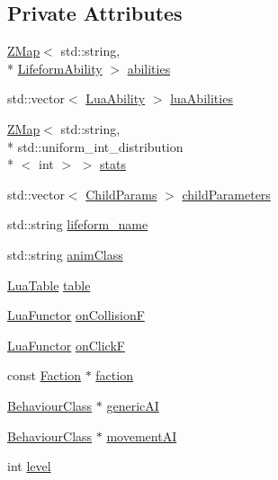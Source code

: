 \subsection*{Private Attributes}
\begin{DoxyCompactItemize}
\item 
\hyperlink{namespaceZeta_a9af2e12c4e432d2a1725f19e5a648a04}{Z\+Map}$<$ std\+::string, \\*
\hyperlink{structZeta_1_1LifeformClass_1_1LifeformAbility}{Lifeform\+Ability} $>$ \hyperlink{classZeta_1_1LifeformClass_a002f20ed3a907ee996b35fbd79d6fb5d}{abilities}
\item 
std\+::vector$<$ \hyperlink{structZeta_1_1LifeformClass_1_1LuaAbility}{Lua\+Ability} $>$ \hyperlink{classZeta_1_1LifeformClass_af30b98b4fe2f81cb08c053539625ddca}{lua\+Abilities}
\item 
\hyperlink{namespaceZeta_a9af2e12c4e432d2a1725f19e5a648a04}{Z\+Map}$<$ std\+::string, \\*
std\+::uniform\+\_\+int\+\_\+distribution\\*
$<$ int $>$ $>$ \hyperlink{classZeta_1_1LifeformClass_a4451d269f7dc4c5544d8b89b63a420ca}{stats}
\item 
std\+::vector$<$ \hyperlink{classZeta_1_1LifeformClass_1_1ChildParams}{Child\+Params} $>$ \hyperlink{classZeta_1_1LifeformClass_abe8c654163027c7b4810c115ee40a928}{child\+Parameters}
\item 
std\+::string \hyperlink{classZeta_1_1LifeformClass_aea28cfcaa64c28804ca61c4a29916380}{lifeform\+\_\+name}
\item 
std\+::string \hyperlink{classZeta_1_1LifeformClass_a0857894140b809d306d5ae432988e859}{anim\+Class}
\item 
\hyperlink{classZeta_1_1LuaTable}{Lua\+Table} \hyperlink{classZeta_1_1LifeformClass_aa8731df77ae7bd670fea69e182266dd3}{table}
\item 
\hyperlink{classZeta_1_1LuaFunctor}{Lua\+Functor} \hyperlink{classZeta_1_1LifeformClass_a13a27238c6107f52ec96528a36e783b4}{on\+Collision\+F}
\item 
\hyperlink{classZeta_1_1LuaFunctor}{Lua\+Functor} \hyperlink{classZeta_1_1LifeformClass_a47cd54e7ddee3d1da5413b2d30f77b40}{on\+Click\+F}
\item 
const \hyperlink{classZeta_1_1Faction}{Faction} $\ast$ \hyperlink{classZeta_1_1LifeformClass_a9784dbf810a8da0ede8893bf5dc7f6ba}{faction}
\item 
\hyperlink{classZeta_1_1BehaviourClass}{Behaviour\+Class} $\ast$ \hyperlink{classZeta_1_1LifeformClass_a2a2d0934222b4115f89c295f31f43f09}{generic\+A\+I}
\item 
\hyperlink{classZeta_1_1BehaviourClass}{Behaviour\+Class} $\ast$ \hyperlink{classZeta_1_1LifeformClass_a2bb480c69b4b233f19ecc8e5b01c426e}{movement\+A\+I}
\item 
int \hyperlink{classZeta_1_1LifeformClass_ab00327ecb94395422bc02d9ff5c7bfb3}{level}
\end{DoxyCompactItemize}
